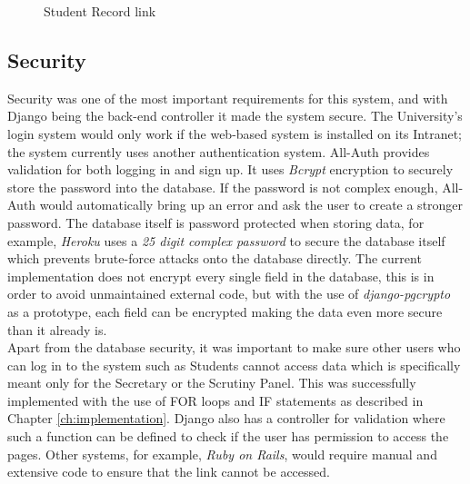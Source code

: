 \documentclass[../main.tex]{subfiles}
\begin{document}
\begin{figure}[H]
        \caption{\label{fig:studlink} Student Record link}
      \end{figure}
      
\subsection*{Security}  
Security was one of the most important requirements for this system, and with Django being the back-end controller it made the system secure. The University's login system would only work if the web-based system is installed on its Intranet; the system currently uses another authentication system. All-Auth\cite{allauth} provides validation for both logging in and sign up. It uses \textit{Bcrypt}\cite{bcrypt} encryption to securely store the password into the database. If the password is not complex enough, All-Auth would automatically bring up an error and ask the user to create a stronger password. The database itself is password protected when storing data, for example, \textit{Heroku} uses a \textit{25 digit complex password} to secure the database itself which prevents brute-force attacks onto the database directly. The current implementation does not encrypt every single field in the database, this is in order to avoid unmaintained external code, but with the use of \textit{django-pgcrypto}\cite{dbencrypt} as a prototype, each field can be encrypted making the data even more secure than it already is. \\[4mm]

Apart from the database security, it was important to make sure other users who can log in to the system such as Students cannot access data which is specifically meant only for the Secretary or the Scrutiny Panel. This was successfully implemented with the use of FOR loops and IF statements as described in Chapter \ref{ch:implementation}. Django also has a controller for validation where such a function can be defined to check if the user has permission to access the pages. Other systems, for example, \textit{Ruby on Rails}, would require manual and extensive code to ensure that the link cannot be accessed. \\[4mm]
\end{document}
